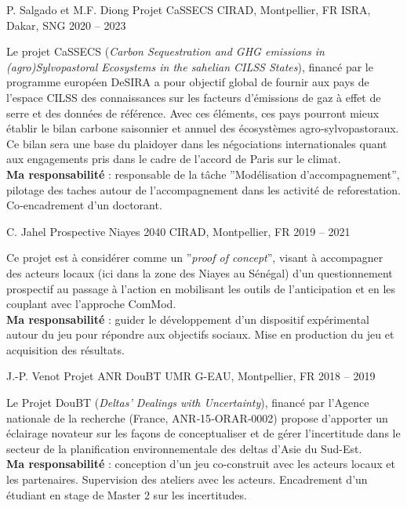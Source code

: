 \begin{cventries}
  \cventry
    {P. Salgado et M.F. Diong} %
    {Projet CaSSECS} %
    {CIRAD, Montpellier, FR \hspace{5em} ISRA, Dakar, SNG} %
    {2020 -- 2023} %
    {
      \begin{cvitems} %
        Le projet CaSSECS (\emph{Carbon Sequestration and GHG emissions in (agro)Sylvopastoral Ecosystems in the sahelian CILSS States}), financé par le programme européen DeSIRA a pour objectif global de fournir aux pays de l’espace CILSS des connaissances sur les facteurs d’émissions de gaz à effet de serre et des données de référence. Avec ces éléments, ces pays pourront mieux établir le bilan carbone saisonnier et annuel des écosystèmes agro‑sylvopastoraux. Ce bilan sera une base du plaidoyer dans les négociations internationales quant aux engagements pris dans le cadre de l’accord de Paris sur le climat.\\
        \textbf{Ma responsabilité } : responsable de la tâche ”Modélisation d’accompagnement”, pilotage des taches autour de l'accompagnement dans les activité de reforestation. Co‑encadrement d’un doctorant.
      \end{cvitems}
    }

  \cventry
  {C. Jahel} %
  {Prospective Niayes 2040} %
  {CIRAD, Montpellier, FR} %
  {2019 -- 2021} %
  {
    \begin{cvitems} %
      Ce projet est à considérer comme un ”\textit{proof of concept}”, visant à accompagner des acteurs locaux (ici dans la zone des Niayes au Sénégal) d’un questionnement prospectif au passage à l’action en mobilisant les outils de l’anticipation et en les couplant avec l’approche ComMod.\\
      \textbf{Ma responsabilité} : guider le développement d'un dispositif expérimental autour du jeu pour répondre aux objectifs sociaux. Mise en production du jeu et acquisition des résultats.
    \end{cvitems}
  }

  \cventry
  {J.-P. Venot} %
  {Projet ANR DouBT} %
  {UMR G-EAU, Montpellier, FR} %
  {2018 -- 2019} %
  {
    \begin{cvitems} %
      Le Projet DouBT (\emph{Deltas' Dealings with Uncertainty}), financé par l'Agence nationale de la recherche (France, ANR‑15‑ORAR‑0002) propose d'apporter un éclairage novateur sur les façons de conceptualiser et de gérer l'incertitude dans le secteur de la planification environnementale des deltas d'Asie du Sud-Est.\\
      \textbf{Ma responsabilité} : conception d'un jeu co-construit avec les acteurs locaux et les partenaires.  Supervision des ateliers avec les acteurs. Encadrement d’un étudiant en stage de Master 2 sur les incertitudes.
    \end{cvitems}
  }


\end{cventries}

